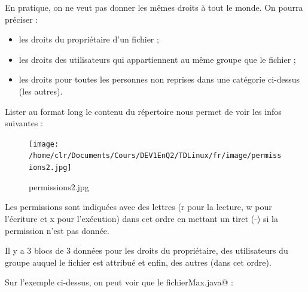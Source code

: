 \documentclass[11pt,a4paper]{article}
\begin{document}
            \par
        
				  En pratique, on ne veut pas donner les m\^emes droits \`a tout le monde. On pourra pr\'eciser :
				  
					\begin{itemize}
				
			\item les droits du propri\'etaire d'un fichier ;
			\item les droits des utilisateurs qui appartiennent au m\^eme groupe que le fichier ;
			\item les droits pour toutes les personnes non reprises dans une cat\'egorie ci-dessus (les autres).
					\end{itemize}
				
            \par
        
				  Lister au format long le contenu du r\'epertoire nous permet de voir les infos suivantes :
				
            \par
        \begin{figure}[hbt]
				    \begin{center}
					\texttt{[image: /home/clr/Documents/Cours/DEV1EnQ2/TDLinux/fr/image/permissions2.jpg]}
						\end{center}
                
                    \caption[permissions2.jpg]{permissions2.jpg}
                \end{figure}
                    
            \par
        
          Les permissions sont indiqu\'ees avec des lettres (r pour la lecture, w pour l'\'ecriture et x pour l'ex\'ecution) 
          dans cet ordre en mettant un tiret (-) si la permission n'est pas donn\'ee. 
        
            \par
        
          Il y a 3 blocs de 3 donn\'ees pour les droits du propri\'etaire, des utilisateurs du groupe auquel le fichier est attribu\'e et enfin, des autres (dans cet ordre).
        
            \par
        
          Sur l'exemple ci-dessus, on peut voir que le fichier\verb@ Max.java@ :
          
\end{document}
